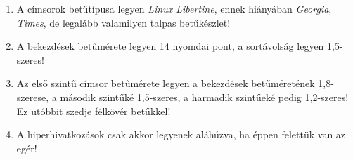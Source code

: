 \begin{frame}
\begin{columns}[c]
\begin{enumerate}
        \item A címsorok betűtípusa legyen \emph{Linux Libertine}, ennek hiányában \emph{Georgia}, \emph{Times}, de legalább valamilyen talpas betűkészlet!
        \item A bekezdések betűmérete legyen 14 nyomdai pont, a sortávolság legyen 1,5-szeres!
        \item Az első szintű címsor betűmérete legyen a bekezdések betűméretének 1,8-szerese, a második szintűké 1,5-szeres, a harmadik szintűeké pedig 1,2-szeres! Ez utóbbit szedje félkövér betűkkel!
        \item A hiperhivatkozások csak akkor legyenek aláhúzva, ha éppen felettük van az egér!
        \setcounter{feladatSzamlalo}{\theenumi}
      \end{enumerate}
  \end{columns}
\end{frame}

